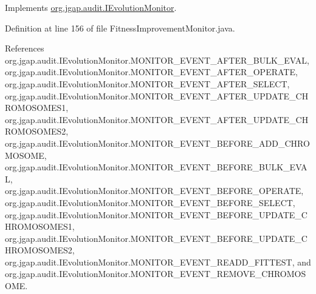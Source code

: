 Implements \hyperlink{interfaceorg_1_1jgap_1_1audit_1_1_i_evolution_monitor_a0358692771cccc5f0affe4ae2ac17869}{org.\-jgap.\-audit.\-I\-Evolution\-Monitor}.



Definition at line 156 of file Fitness\-Improvement\-Monitor.\-java.



References org.\-jgap.\-audit.\-I\-Evolution\-Monitor.\-M\-O\-N\-I\-T\-O\-R\-\_\-\-E\-V\-E\-N\-T\-\_\-\-A\-F\-T\-E\-R\-\_\-\-B\-U\-L\-K\-\_\-\-E\-V\-A\-L, org.\-jgap.\-audit.\-I\-Evolution\-Monitor.\-M\-O\-N\-I\-T\-O\-R\-\_\-\-E\-V\-E\-N\-T\-\_\-\-A\-F\-T\-E\-R\-\_\-\-O\-P\-E\-R\-A\-T\-E, org.\-jgap.\-audit.\-I\-Evolution\-Monitor.\-M\-O\-N\-I\-T\-O\-R\-\_\-\-E\-V\-E\-N\-T\-\_\-\-A\-F\-T\-E\-R\-\_\-\-S\-E\-L\-E\-C\-T, org.\-jgap.\-audit.\-I\-Evolution\-Monitor.\-M\-O\-N\-I\-T\-O\-R\-\_\-\-E\-V\-E\-N\-T\-\_\-\-A\-F\-T\-E\-R\-\_\-\-U\-P\-D\-A\-T\-E\-\_\-\-C\-H\-R\-O\-M\-O\-S\-O\-M\-E\-S1, org.\-jgap.\-audit.\-I\-Evolution\-Monitor.\-M\-O\-N\-I\-T\-O\-R\-\_\-\-E\-V\-E\-N\-T\-\_\-\-A\-F\-T\-E\-R\-\_\-\-U\-P\-D\-A\-T\-E\-\_\-\-C\-H\-R\-O\-M\-O\-S\-O\-M\-E\-S2, org.\-jgap.\-audit.\-I\-Evolution\-Monitor.\-M\-O\-N\-I\-T\-O\-R\-\_\-\-E\-V\-E\-N\-T\-\_\-\-B\-E\-F\-O\-R\-E\-\_\-\-A\-D\-D\-\_\-\-C\-H\-R\-O\-M\-O\-S\-O\-M\-E, org.\-jgap.\-audit.\-I\-Evolution\-Monitor.\-M\-O\-N\-I\-T\-O\-R\-\_\-\-E\-V\-E\-N\-T\-\_\-\-B\-E\-F\-O\-R\-E\-\_\-\-B\-U\-L\-K\-\_\-\-E\-V\-A\-L, org.\-jgap.\-audit.\-I\-Evolution\-Monitor.\-M\-O\-N\-I\-T\-O\-R\-\_\-\-E\-V\-E\-N\-T\-\_\-\-B\-E\-F\-O\-R\-E\-\_\-\-O\-P\-E\-R\-A\-T\-E, org.\-jgap.\-audit.\-I\-Evolution\-Monitor.\-M\-O\-N\-I\-T\-O\-R\-\_\-\-E\-V\-E\-N\-T\-\_\-\-B\-E\-F\-O\-R\-E\-\_\-\-S\-E\-L\-E\-C\-T, org.\-jgap.\-audit.\-I\-Evolution\-Monitor.\-M\-O\-N\-I\-T\-O\-R\-\_\-\-E\-V\-E\-N\-T\-\_\-\-B\-E\-F\-O\-R\-E\-\_\-\-U\-P\-D\-A\-T\-E\-\_\-\-C\-H\-R\-O\-M\-O\-S\-O\-M\-E\-S1, org.\-jgap.\-audit.\-I\-Evolution\-Monitor.\-M\-O\-N\-I\-T\-O\-R\-\_\-\-E\-V\-E\-N\-T\-\_\-\-B\-E\-F\-O\-R\-E\-\_\-\-U\-P\-D\-A\-T\-E\-\_\-\-C\-H\-R\-O\-M\-O\-S\-O\-M\-E\-S2, org.\-jgap.\-audit.\-I\-Evolution\-Monitor.\-M\-O\-N\-I\-T\-O\-R\-\_\-\-E\-V\-E\-N\-T\-\_\-\-R\-E\-A\-D\-D\-\_\-\-F\-I\-T\-T\-E\-S\-T, and org.\-jgap.\-audit.\-I\-Evolution\-Monitor.\-M\-O\-N\-I\-T\-O\-R\-\_\-\-E\-V\-E\-N\-T\-\_\-\-R\-E\-M\-O\-V\-E\-\_\-\-C\-H\-R\-O\-M\-O\-S\-O\-M\-E.

